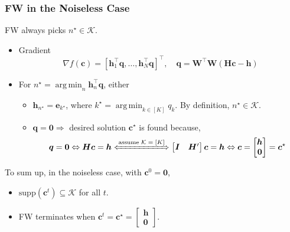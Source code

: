 \documentclass[10pt,xcolor={usenames,dvipsnames,table}]{beamer}
\newcommand{\T}{\!\top\!}
\DeclareMathOperator*{\argmin}{arg\,min}
\begin{document}
\begin{frame}[label=fine]
    \frametitle{FW in the Noiseless Case}
    \begin{block}
        
    FW always picks $n^{\star} \in \mathcal{K}$.
    \end{block}
    \begin{itemize}
        \item Gradient
    \begin{equation*}
        \nabla f(\mathbf{c}) 
        = [\bm{h}_1^{\T}\bm{q}, \ldots , \bm{h}_N^{\T}\bm{q}]^{\T}, \quad \bm{q} = \bm{W}^{\T}\bm{W}(\bm{H}\bm{c}-\bm{h})
    \end{equation*}
    \item For $n^{\star} = \argmin_{n} \bm{h}_n^{\T}\bm{q}$, either
    \begin{itemize}
        \item $\bm{h}_{n^{\star}} = \bm{e}_{k^{\star}}$, where $k^{\star} = \argmin_{k \in [K]} q_k$. By definition, $n^{\star} \in \mathcal{K}$.
        \item $\bm{q} = \bm{0} \Rightarrow$ desired solution $\bm{c}^{\star}$  is found because, 
            \[
            \bm{q} = \bm{0} \Leftrightarrow
            \bm{H}\bm{c} = \bm{h} 
            \xLeftrightarrow{\text{assume $\mathcal{K}=[K]$}}
            \begin{bmatrix}
                \bm{I} & \bm{H}'
            \end{bmatrix}  \bm{c} = \bm{h}
            \Leftrightarrow 
            \bm{c} = \begin{bmatrix}
            \bm{h} \\ \bm{0}
            \end{bmatrix} =\bm{c}^{\star}
            \] 
    \end{itemize}
    \end{itemize}

    To sum up, in the noiseless case, with $\bm{c}^{0} = \bm{0}$,
    \begin{itemize}
        \item $\text{supp}(\bm{c}^{t}) \subseteq \mathcal{K}$ for all $t$.
        \item FW terminates when $\bm{c}^{t} = \bm{c}^{\star} = \begin{bmatrix}
        \bm{h} \\ \bm{0}
        \end{bmatrix}$.
    \end{itemize}
    

\end{frame}
\end{document}
